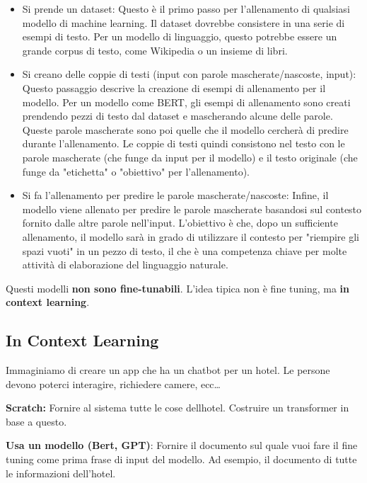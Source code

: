 \begin{itemize}
    \item Si prende un dataset: Questo è il primo passo per l'allenamento di qualsiasi
          modello di machine learning. Il dataset dovrebbe consistere in una serie di
          esempi di testo. Per un modello di linguaggio, questo potrebbe essere un grande
          corpus di testo, come Wikipedia o un insieme di libri.
    \item Si creano delle coppie di testi (input con parole mascherate/nascoste, input):
          Questo passaggio descrive la creazione di esempi di allenamento per il modello.
          Per un modello come BERT, gli esempi di allenamento sono creati prendendo pezzi
          di testo dal dataset e mascherando alcune delle parole. Queste parole
          mascherate sono poi quelle che il modello cercherà di predire durante
          l'allenamento. Le coppie di testi quindi consistono nel testo con le parole
          mascherate (che funge da input per il modello) e il testo originale (che funge
          da "etichetta" o "obiettivo" per l'allenamento).
    \item Si fa l'allenamento per predire le parole mascherate/nascoste: Infine, il
          modello viene allenato per predire le parole mascherate basandosi sul contesto
          fornito dalle altre parole nell'input. L'obiettivo è che, dopo un sufficiente
          allenamento, il modello sarà in grado di utilizzare il contesto per "riempire
          gli spazi vuoti" in un pezzo di testo, il che è una competenza chiave per molte
          attività di elaborazione del linguaggio naturale.
\end{itemize}


Questi modelli \textbf{non sono fine-tunabili}. L'idea tipica non è fine tuning, ma \textbf{in context learning}.

\subsection{In Context Learning}

Immaginiamo di creare un app che ha un chatbot per un hotel. Le persone devono poterci interagire, richiedere camere, ecc\dots

\textbf{Scratch:} Fornire al sistema tutte le cose dellhotel. Costruire un transformer in base a questo.

\textbf{Usa un modello (Bert, GPT)}: Fornire il documento sul quale vuoi fare il fine tuning come prima frase di input del modello. Ad esempio, il documento di tutte le informazioni dell'hotel.

